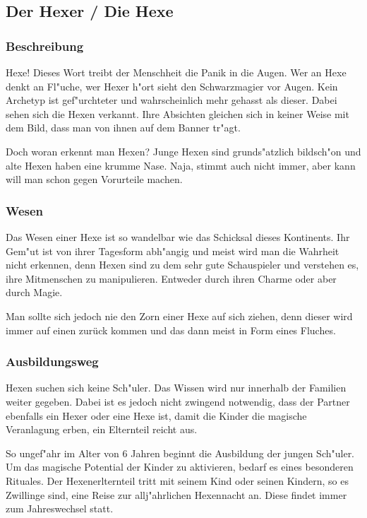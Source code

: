 \subsection{Der Hexer / Die Hexe}
\subsubsection{Beschreibung}
\par Hexe! Dieses Wort treibt der Menschheit die Panik in die
Augen. Wer an Hexe denkt an Fl"uche, wer Hexer h"ort sieht den
Schwarzmagier vor Augen.
Kein Archetyp ist gef"urchteter und wahrscheinlich mehr gehasst als
dieser. Dabei sehen sich die Hexen verkannt. Ihre Absichten gleichen
sich in keiner Weise mit dem Bild, dass man von ihnen auf dem Banner
tr"agt.
\par Doch woran erkennt man Hexen? Junge Hexen sind grunds"atzlich
bildsch"on und alte Hexen haben eine krumme Nase. Naja, stimmt auch
nicht immer, aber kann will man schon gegen Vorurteile machen.
\subsubsection{Wesen}
\par Das Wesen einer Hexe ist so wandelbar wie das Schicksal dieses
Kontinents. Ihr Gem"ut ist von ihrer Tagesform abh"angig und meist
wird man die Wahrheit nicht erkennen, denn Hexen sind zu dem sehr
gute Schauspieler und verstehen es, ihre Mitmenschen zu
manipulieren. Entweder durch ihren Charme oder aber durch Magie.
\par Man sollte sich jedoch nie den Zorn einer Hexe auf sich ziehen,
denn dieser wird immer auf einen zurück kommen und das dann meist in
Form eines Fluches.
\subsubsection{Ausbildungsweg}
\par Hexen suchen sich keine Sch"uler. Das Wissen wird nur innerhalb
der Familien weiter gegeben. Dabei ist es jedoch nicht zwingend
notwendig, dass der Partner ebenfalls ein Hexer oder eine Hexe ist,
damit die Kinder die magische Veranlagung erben, ein Elternteil
reicht aus.
\par So ungef"ahr im Alter von 6 Jahren beginnt die Ausbildung der
jungen Sch"uler. Um das magische Potential der Kinder zu aktivieren,
bedarf es eines besonderen Rituales. Der Hexenerlternteil tritt mit
seinem Kind oder seinen Kindern, so es Zwillinge sind, eine Reise
zur allj"ahrlichen Hexennacht an. Diese findet immer zum
Jahreswechsel statt.
